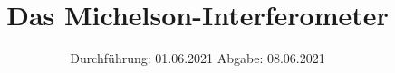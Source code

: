 

\subject{Versuch Nr.V401
}
\title{Das Michelson-Interferometer}
\date{%
  Durchführung: 01.06.2021
  \hspace{3em}
  Abgabe: 08.06.2021
}



\maketitle
\thispagestyle{empty}
\tableofcontents
\newpage 






%

\nocite{*}

\printbibliography{}


